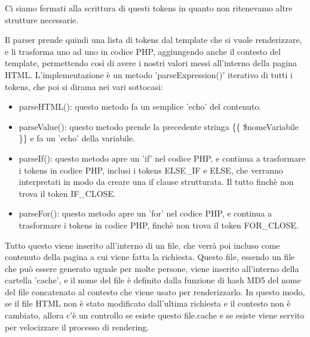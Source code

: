 Ci siamo fermati alla scrittura di questi tokens in quanto non ritenevamo altre strutture necessarie.

Il parser prende quindi una lista di tokens dal template che si vuole renderizzare, e li trasforma uno ad uno in codice PHP, aggiungendo anche il contesto del template, permettendo così di avere i nostri valori messi all'interno della pagina HTML. L'implementazione è un metodo 'parseExpression()' iterativo di tutti i tokens, che poi si dirama nei vari sottocasi:
\begin{itemize}
    \item parseHTML(): questo metodo fa un semplice 'echo' del contenuto.
    \item parseValue(): questo metodo prende la precedente stringa \{\{ \$nomeVariabile \}\} e fa un 'echo' della variabile.
    \item parseIf(): questo metodo apre un 'if' nel codice PHP, e continua a trasformare i tokens in codice PHP, inclusi i tokens ELSE\_IF e ELSE, che verranno interpretati in modo da creare una if clause strutturata. Il tutto finchè non trova il token IF\_CLOSE.
    \item parseFor(): questo metodo apre un 'for' nel codice PHP, e continua a trasformare i tokens in codice PHP, finchè non trova il token FOR\_CLOSE.
\end{itemize}

Tutto questo viene inserito all'interno di un file, che verrà poi incluso come contenuto della pagina a cui viene fatta la richiesta. Questo file, essendo un file che può essere generato uguale per molte persone, viene inserito all'interno della cartella 'cache', e il nome del file è definito dalla funzione di hash MD5 del nome del file concatenato al contesto che viene usato per renderizzarlo. In questo modo, se il file HTML non è stato modificato dall'ultima richiesta e il contesto non è cambiato, allora c'è un controllo se esiste questo file.cache e se esiste viene servito per velocizzare il processo di rendering.

